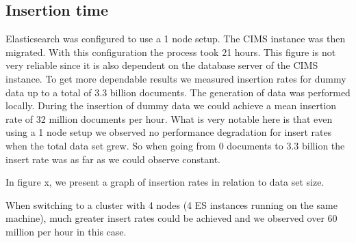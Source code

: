 %
%

\subsection{Insertion time}

Elasticsearch was configured to use a 1 node setup. The CIMS instance was then migrated. With this configuration the process took 21 hours. This figure is not very reliable since it is also dependent on the database server of the CIMS instance. To get more dependable results we measured insertion rates for dummy data up to a total of 3.3 billion documents. The generation of data was performed locally. During the insertion of dummy data we could achieve a mean insertion rate of 32 million documents per hour. What is very notable here is that even using a 1 node setup we observed no performance degradation for insert rates when the total data set grew. So when going from 0 documents to 3.3 billion the insert rate was as far as we could observe constant.

In figure x, we present a graph of insertion rates in relation to data set size.

When switching to a cluster with 4 nodes (4 ES instances running on the same machine), much greater insert rates could be achieved and we observed over 60 million per hour in this case.


